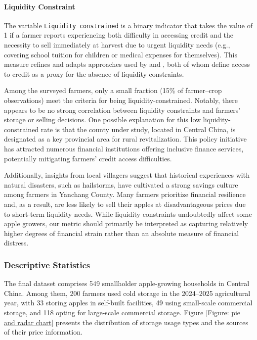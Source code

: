 \documentclass[12pt]{article}
\begin{document}
\paragraph{Liquidity Constraint} The variable \texttt{Liquidity constrained} is a binary indicator that takes the value of 1 if a farmer reports experiencing both difficulty in accessing credit and the necessity to sell immediately at harvest due to urgent liquidity needs (e.g., covering school tuition for children or medical expenses for themselves). This measure refines and adapts approaches used by \cite{albuquerque2024market} and \cite{stephens2011incomplete}, both of whom define access to credit as a proxy for the absence of liquidity constraints. 

Among the surveyed farmers, only a small fraction (15\% of farmer–crop observations) meet the criteria for being liquidity-constrained. Notably, there appears to be no strong correlation between liquidity constraints and farmers' storage or selling decisions. One possible explanation for this low liquidity-constrained rate is that the county under study, located in Central China, is designated as a key provincial area for rural revitalization. This policy initiative has attracted numerous financial institutions offering inclusive finance services, potentially mitigating farmers' credit access difficulties. 

Additionally, insights from local villagers suggest that historical experiences with natural disasters, such as hailstorms, have cultivated a strong savings culture among farmers in Yanchang County. Many farmers prioritize financial resilience and, as a result, are less likely to sell their apples at disadvantageous prices due to short-term liquidity needs. While liquidity constraints undoubtedly affect some apple growers, our metric should primarily be interpreted as capturing relatively higher degrees of financial strain rather than an absolute measure of financial distress.

\subsubsection{Descriptive Statistics}
\noindent The final dataset comprises 549 smallholder apple-growing households in Central China. Among them, 200 farmers used cold storage in the 2024–2025 agricultural year, with 33 storing apples in self-built facilities, 49 using small-scale commercial storage, and 118 opting for large-scale commercial storage. Figure \ref{Figure: pie and radar chart} presents the distribution of storage usage types and the sources of their price information. 
\end{document}
